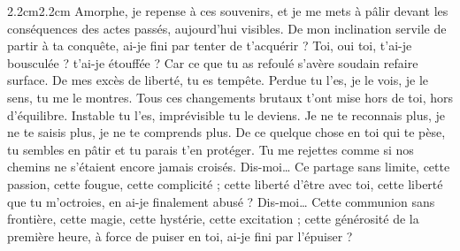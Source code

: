 \begin{adjustwidth}{2.2cm}{2.2cm}
Amorphe, je repense à ces souvenirs, et je me mets à pâlir devant les conséquences des actes passés, aujourd’hui visibles. De mon inclination servile de partir à ta conquête, ai-je fini par tenter de t’acquérir ? Toi, oui toi, t’ai-je bousculée ? t’ai-je étouffée ? Car ce que tu as refoulé s’avère soudain refaire surface. De mes excès de liberté, tu es tempête. Perdue tu l’es, je le vois, je le sens, tu me le montres. Tous ces changements brutaux t’ont mise hors de toi, hors d’équilibre. Instable tu l’es, imprévisible tu le deviens. Je ne te reconnais plus, je ne te saisis plus, je ne te comprends plus. De ce quelque chose en toi qui te pèse, tu sembles en pâtir et tu parais t’en protéger. Tu me rejettes comme si nos chemins ne s’étaient encore jamais croisés.  Dis-moi… Ce partage sans limite, cette passion, cette fougue, cette complicité ; cette liberté d’être avec toi, cette liberté que tu m’octroies, en ai-je finalement abusé ? Dis-moi… Cette communion sans frontière, cette magie, cette hystérie, cette excitation ; cette générosité de la première heure, à force de puiser en toi, ai-je fini par l’épuiser ?


\end{adjustwidth}
